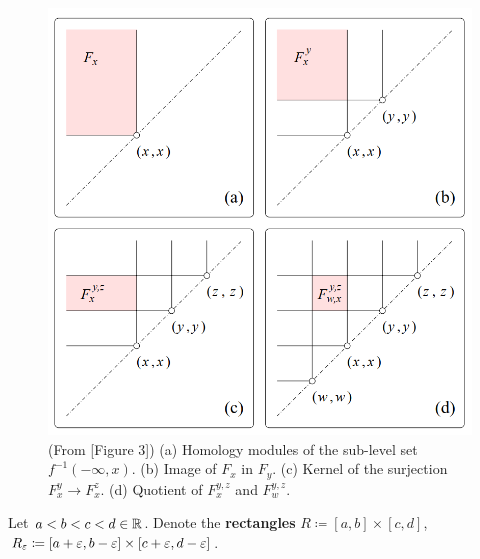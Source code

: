 \begin{figure}[H]
    \centering
    \includegraphics[width=0.6\linewidth]{figures/homology-modules.png}
    \caption[Persistent homology notation]{(From \cite{Edelsbrunner}[Figure 3]) (a) Homology modules of the sub-level set $f^{-1}(-\infty, x) $. (b) Image of $ F_x $ in $ F_y $. (c) Kernel of the surjection $ F_x^y \to F_x^z $. (d) Quotient of $ F_x^{y, z} $ and $ F_w^{y, z} $.}
    \label{fig:homology-modules}
\end{figure}

Let $ a < b < c < d \in \mathbb R $. Denote the {\bf rectangles} $ R \coloneq [a, b] \times [c, d] $, $ R_\varepsilon \coloneq [a+\varepsilon, b-\varepsilon] \times [c+\varepsilon, d -\varepsilon] $.


